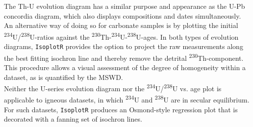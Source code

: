 \begin{refsection}
The Th-U evolution diagram has a similar purpose and appearance as the
U-Pb concordia diagram, which also displays compositions and dates
simultaneously. An alternative way of doing so for carbonate samples
is by plotting the initial
\textsuperscript{234}U/\textsuperscript{238}U-ratios against the
\textsuperscript{230}Th-\textsuperscript{234}U-\textsuperscript{238}U-ages.
In both types of evolution diagrams, \texttt{IsoplotR} provides the
option to project the raw measurements along the best fitting isochron
line and thereby remove the detrital
\textsuperscript{230}Th-component. This procedure allows a visual
assessment of the degree of homogeneity within a dataset, as is
quantified by the MSWD.\\

Neither the U-series evolution diagram nor the
\textsuperscript{234}U/\textsuperscript{238}U vs. age plot is
applicable to igneous datasets, in which \textsuperscript{234}U and
\textsuperscript{238}U are in secular equilibrium.  For such datasets,
\texttt{IsoplotR} produces an Osmond-style regression plot that is
decorated with a fanning set of isochron lines.


\end{refsection}
